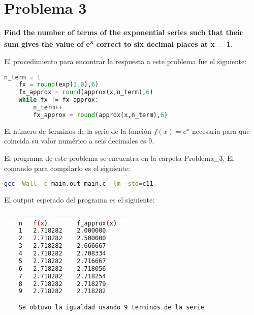 \section*{Problema 3}
\textbf{Find the number of terms of the exponential series such that their sum gives the value of e\textsuperscript{x} correct to six decimal places at x = 1.}

El procedimiento para encontrar la respuesta a este problema fue el siguiente:
\begin{lstlisting}[language=python]
    n_term = 1
    fx = round(exp(1.0),6)
    fx_approx = round(approx(x,n_term),6)
    while fx != fx_approx:
        n_term++
        fx_approx = round(approx(x,n_term),6)
\end{lstlisting}

El número de terminos de la serie de la función $f(x)=e^x$ necesaria para que coincida su valor numérico a seis decimales es 9.

El programa de este problema se encuentra en la carpeta \textcolor{citecolor}{Problema\_3}. El comando para compilarlo es el siguiente:

\begin{lstlisting}[language=bash]
    gcc -Wall -o main.out main.c -lm -std=c11
\end{lstlisting}

El output esperado del programa es el siguiente:
\begin{lstlisting}[language=bash]
    -----------------------------------
    n	f(x)		f_approx(x)
    1	2.718282	2.000000
    2	2.718282	2.500000
    3	2.718282	2.666667
    4	2.718282	2.708334
    5	2.718282	2.716667
    6	2.718282	2.718056
    7	2.718282	2.718254
    8	2.718282	2.718279
    9	2.718282	2.718282

    Se obtuvo la igualdad usando 9 terminos de la serie
\end{lstlisting}